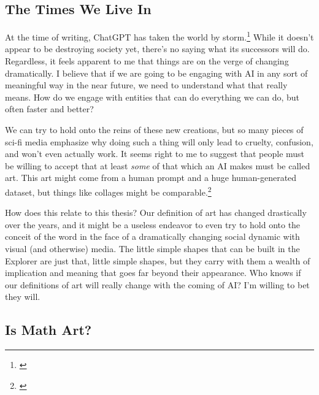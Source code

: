 \documentclass[12pt,twoside]{reedthesis}
\begin{document}
\subsection{The Times We Live In} %
\label{AI-Art}

	At the time of writing, ChatGPT has taken the world by storm.\footnote{\cite{ChatGPT}} While it doesn't appear to be destroying society yet, there's no saying what its successors will do. Regardless, it feels apparent to me that things are on the verge of changing dramatically. I believe that if we are going to be engaging with AI in any sort of meaningful way in the near future, we need to understand what that really means. How do we engage with entities that can do everything we can do, but often faster and better?
	
	We can try to hold onto the reins of these new creations, but so many pieces of sci-fi media emphasize why doing such a thing will only lead to cruelty, confusion, and won't even actually work. It seems right to me to suggest that people must be willing to accept that at least \textit{some} of that which an AI makes must be called art. This art might come from a human prompt and a huge human-generated dataset, but things like collages might be comparable.\footnote{\cite{NYT2023}}
	
	
	How does this relate to this thesis? Our definition of art has changed drastically over the years, and it might be a useless endeavor to even try to hold onto the conceit of the word in the face of a dramatically changing social dynamic with visual (and otherwise) media. The little simple shapes that can be built in the Explorer are just that, little simple shapes, but they carry with them a wealth of implication and meaning that goes far beyond their appearance. Who knows if our definitions of art will really change with the coming of AI? I'm willing to bet they will.

\subsection{Is Math Art?}
\end{document}

